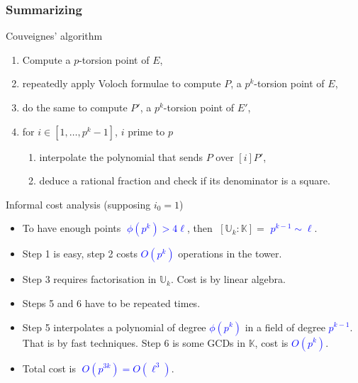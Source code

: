 \documentclass[10pt]{beamer}
\newcommand{\blue}[1]{\textcolor{blue}{#1}}  %
\newcommand{\K}{\mathbb{K}}  %
\newcommand{\U}{\mathbb{U}}  %
\newcommand{\euler}{\phi}  %
\newcommand{\0}{\mathcal{O}}  %
\begin{document}
\begin{frame}
  \frametitle{Summarizing}

  \vspace{-1mm}

  \begin{block}{Couveignes' algorithm}
    \begin{enumerate}
    \item Compute a $p$-torsion point of $E$,
    \item repeatedly apply Voloch formulae to compute $P$, a $p^k$-torsion
      point of $E$,
    \item do the same to compute $P'$, a $p^k$-torsion point of $E'$,
    \item for $i \in [1,\dots,p^k-1]$, $i$ prime to $p$
      \begin{enumerate}
      \item interpolate the polynomial that sends $P$ over $[i]P'$,
      \item deduce a rational fraction and check if its denominator is
        a square.
      \end{enumerate}
    \end{enumerate}
  \end{block}

  \vspace{-1mm}

  \begin{block}{Informal cost analysis (supposing $i_0 = 1$)}
    \begin{itemize}
    \item To have enough points \blue{$\;\euler(p^k) > 4\ell$}, then
      $\;[\U_k:\K] =$ \blue{$p^{k-1} \sim \ell$}.
    \item Step 1 is easy, step 2 costs \blue{$O(p^k)$}
      operations in the tower.
    \item Step 3 requires factorisation in $\U_k$. Cost is
      \alt<2>{\alert{$O(p^{3k})$}}{\blue{$O(p^{3k})$}} by linear
      algebra.
    \item Steps 5 and 6 have to be repeated
      \alt<2>{\alert{$\euler(p^k)$}}{\blue{$\euler(p^k)$}} times.
    \item Step 5 interpolates a polynomial of degree
      \blue{$\euler(p^k)$} in a field of degree \blue{$p^{k-1}$}. That
      is \alt<2>{\alert{$O(p^{2k})$}}{\blue{$O(p^{2k})$}} by fast
      techniques.  Step 6 is some GCDs in $\K$, cost is
      \blue{$O(p^k)$}.
    \item<2> Total cost is \blue{$\;O(p^{3k}) = O(\ell^3)$}.
    \end{itemize}
  \end{block}
  
\end{frame}
\end{document}
